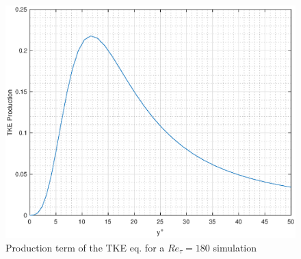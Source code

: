 \begin{figure}
\begin{center}
\includegraphics[scale=0.55]{grafici/tke_prod_180.eps}
\caption{Production term of the TKE eq. for a $Re_{\tau}=180$ simulation}
\label{tke:prod:180}
\end{center} 
\end{figure}